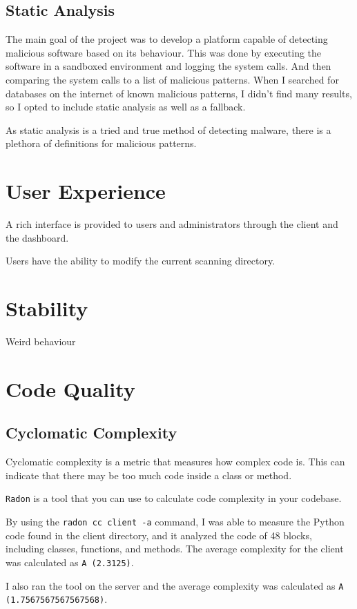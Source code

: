 \subsection{Static Analysis}
The main goal of the project was to develop a platform capable
of detecting malicious software based on its behaviour.
This was done by executing the software in a sandboxed
environment and logging the system calls.
And then comparing the system calls to a list of malicious patterns.
When I searched for databases on the internet of known malicious patterns,
I didn't find many results, so I opted to include static analysis as well as a fallback.

As static analysis is a tried and true method of detecting malware,
there is a plethora of definitions for malicious patterns.

\section{User Experience}
A rich interface is provided to users and administrators through the
client and the dashboard.

Users have the ability to modify the current scanning directory.

\section{Stability}
Weird behaviour

\section{Code Quality}

\subsection{Cyclomatic Complexity}
Cyclomatic complexity is a metric that measures how complex code is.
This can indicate that there may be too much code inside a class or method.

\texttt{Radon} is a tool that you can use to
calculate code complexity in your codebase.

By using the \texttt{radon cc client -a} command,
I was able to measure the Python code found in the client directory,
and it analyzed the code of 48 blocks,
including classes, functions, and methods.
The average complexity for the client was calculated as \texttt{A (2.3125)}.

I also ran the tool on the server and the average complexity
was calculated as \texttt{A (1.7567567567567568)}.

